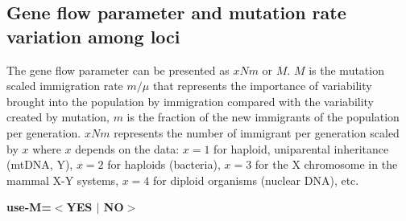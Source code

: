 \subsection*{Gene flow parameter and mutation rate variation among loci}
The gene flow parameter can be presented as $xNm$ or $M$. $M$ is the mutation scaled immigration rate $m/\mu$ that represents the importance of variability brought into the population by immigration compared with the variability created by mutation, $m$ is the fraction of the new immigrants of the population per generation. $xNm$ represents the number of immigrant per generation scaled by $x$ where $x$ depends on the data: $x=1$ for haploid, uniparental inheritance (mtDNA, Y), $x=2$ for haploids (bacteria), $x=3$ for the X chromosome in the mammal X-Y systems, $x=4$ for diploid organisms (nuclear DNA), etc. 
\begin{description}
\item {\bf use-M=$<$YES $|$ NO$>$}



\end{description}
